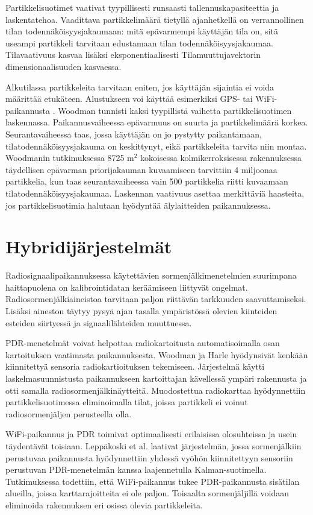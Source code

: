 Partikkelisuotimet vaativat tyypillisesti runsaasti tallennuskapasiteettia
ja laskentatehoa. Vaadittava partikkelimäärä tietyllä ajanhetkellä 
on verrannollinen
tilan todennäköisyysjakaumaan: mitä epävarmempi käyttäjän tila on, sitä
useampi partikkeli tarvitaan edustamaan tilan todennäköisyysjakaumaa.
Tilavaativuus kasvaa lisäksi eksponentiaalisesti
Tilamuuttujavektorin dimensionaalisuuden kasvaessa.

Alkutilassa partikkeleita tarvitaan eniten, jos käyttäjän sijaintia ei
voida määrittää etukäteen. Alustukseen voi käyttää esimerkiksi
GPS- tai WiFi-paikannusta \cite{woodman2009}. Woodman \cite{woodman2010}
tunnisti kaksi tyypillistä
vaihetta partikkelisuotimen laskennassa. Paikannusvaiheessa epävarmuus
on suurta ja partikkelimäärä korkea. Seurantavaiheessa taas, jossa käyttäjän
on jo pystytty paikantamaan, tilatodennäköisyysjakauma on keskittynyt, eikä
partikkeleita tarvita niin montaa. Woodmanin tutkimuksessa 8725
$\text{m}^2$ kokoisessa kolmikerroksisessa rakennuksessa täydellisen epävarman
priorijakauman kuvaamiseen tarvittiin 4 miljoonaa partikkelia, kun taas
seurantavaiheessa vain 500 partikkelia riitti kuvaamaan
tilatodennäköisyysjakaumaa. Laskennan vaativuus asettaa merkittäviä
haasteita, jos partikkelisuotimia halutaan hyödyntää älylaitteiden
paikannuksessa.

\section{Hybridijärjestelmät}

Radiosignaalipaikannuksessa käytettävien sormenjälkimenetelmien suurimpana
haittapuolena on kalibrointidatan keräämiseen liittyvät ongelmat.
Radiosormenjälkiaineistoa tarvitaan paljon riittävän tarkkuuden saavuttamiseksi.
Lisäksi aineston täytyy pysyä ajan tasalla
ympäristössä olevien kiinteiden esteiden siirtyessä ja signaalilähteiden
muuttuessa.

PDR-menetelmät voivat helpottaa radiokartoitusta automatisoimalla osan
kartoituksen vaatimasta paikannuksesta. Woodman ja Harle \cite{woodman2008}
hyödynsivät
kenkään kiinnitettyä sensoria radiokartioituksen tekemiseen. Järjestelmä
käytti laskelmasuunnistusta paikannukseen kartoittajan kävellessä
ympäri rakennusta ja otti samalla radiosormenjälkinäytteitä. 
Muodostettua radiokarttaa hyödynnettiin partikkelisuotimessa
eliminoimalla tilat, joissa partikkeli ei voinut radiosormenjäljen
perusteella olla.

WiFi-paikannus ja PDR toimivat optimaalisesti erilaisissa olosuhteissa
ja usein täydentävät toisiaan.
Leppäkoski et al. \cite{leppakoski2013} laativat
järjestelmän, jossa
sormenjälkiin perustuvaa paikannusta hyödynnettiin yhdessä 
vyöhön kiinnitettyyn sensoriin perustuvan PDR-menetelmän
kanssa laajennetulla Kalman-suotimella. Tutkimuksessa todettiin,
että WiFi-paikannus tukee PDR-paikannusta sisätilan alueilla, joissa
karttarajoitteita ei ole paljon. Toisaalta sormenjäljillä voidaan
eliminoida rakennuksen eri osissa olevia partikkeleita.

